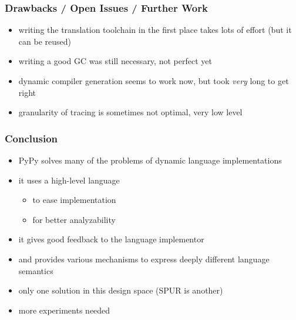 \documentclass[utf8x]{beamer}
\begin{document}
\begin{frame}
  \frametitle{Drawbacks / Open Issues / Further Work}
  \begin{itemize}
  \item writing the translation toolchain in the first place takes lots of effort
    (but it can be reused)
  \item writing a good GC was still necessary, not perfect yet
  \item dynamic compiler generation seems to work now, but took \emph{very} long to get right
  \item granularity of tracing is sometimes not optimal, very low level
  \end{itemize}
\end{frame}

\begin{frame}
  \frametitle{Conclusion}
  \begin{itemize}
      \item PyPy solves many of the problems of dynamic language implementations
      \item it uses a high-level language
      \begin{itemize}
          \item to ease implementation
          \item for better analyzability
      \end{itemize}
      \item it gives good feedback to the language implementor
      \item and provides various mechanisms to express deeply different language semantics
      \pause
      \item only one solution in this design space (SPUR is another)
      \item more experiments needed
  \end{itemize}
\end{frame}
\end{document}
